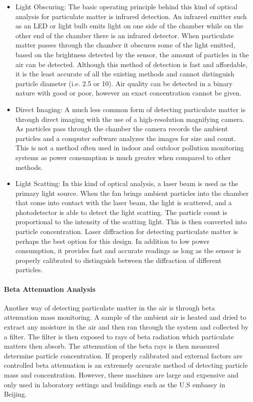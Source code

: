 \begin{itemize} 
\item Light Obscuring:
The basic operating principle behind this kind of optical analysis for particulate matter is infrared detection. An infrared emitter such as an LED or light bulb emits light on one side of the chamber while on the other end of the chamber there is an infrared detector. When particulate matter passes through the chamber it obscures some of the light emitted, based on the brightness detected by the sensor, the amount of particles in the air can be detected. Although this method of detection is fast and affordable, it is the least accurate of all the existing methods and cannot distinguish particle diameter (i.e. 2.5 or 10). Air quality can be detected in a binary nature with good or poor, however an exact concentration cannot be given. 
\item Direct Imaging:
A much less common form of detecting particulate matter is through direct imaging with the use of a high-resolution magnifying camera. As particles pass through the chamber the camera records the ambient particles and a computer software analyzes the images for size and count. This is not a method often used in indoor and outdoor pollution monitoring systems as power consumption is much greater when compared to other methods.
\item Light Scatting:
In this kind of optical analysis, a laser beam is used as the primary light source. When the fan brings ambient particles into the chamber that come into contact with the laser beam, the light is scattered, and a photodetector is able to detect the light scatting. The particle count is proportional to the intensity of the scatting light. This is then converted into particle concentration. Laser diffraction for detecting particulate matter is perhaps the best option for this design. In addition to low power consumption, it provides fast and accurate readings as long as the sensor is properly calibrated to distinguish between the diffraction of different particles. 
\end{itemize}

\paragraph{Beta Attenuation Analysis}
 Another way of detecting particulate matter in the air is through beta attenuation mass monitoring. A sample of the ambient air is heated and dried to extract any moisture in the air and then ran through the system and collected by a filter. The filter is then exposed to rays of beta radiation which particulate matters then absorb. The attenuation of the beta rays is then measured determine particle concentration. If properly calibrated and external factors are controlled beta attenuation is an extremely accurate method of detecting particle mass and concentration. However, these machines are large and expensive and only used in laboratory settings and buildings such as the U.S embassy in Beijing. 

